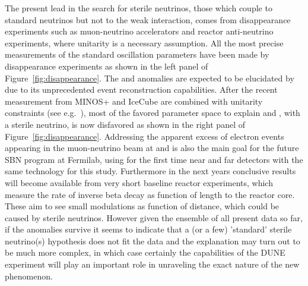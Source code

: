 The present lead in the search for sterile neutrinos, those which couple to standard neutrinos but not to the weak interaction, comes from disappearance experiments such as muon-neutrino accelerators and reactor anti-neutrino experiments, where unitarity is a necessary assumption. All the most precise measurements of the standard oscillation parameters have been made by disappearance experiments as shown in the left panel of Figure~\ref{fig:disappearance}. The  and \miniboone anomalies are expected to be elucidated by \microboone due to its unprecedented event reconstruction capabilities. After the recent measurement from MINOS+ and IceCube are combined with unitarity constraints (see e.g.~\cite{Parke:2015goa}), most of the favored parameter space to explain  and \miniboone, with a sterile neutrino, is now disfavored as shown in the right panel of Figure~\ref{fig:disappearance}. Addressing the apparent excess of electron events appearing in the muon-neutrino beam at \miniboone and  is also the main goal for the future SBN program at Fermilab, using for the first time near and far detectors with the same technology for this study. Furthermore  in the next years conclusive results will become available from very short baseline 
reactor experiments, which measure the rate of inverse beta decay 
as function of length to the reactor core. These aim to see
small modulations as function of distance, which could be caused
by sterile neutrinos. However given the ensemble of 
all present data so far, if the anomalies survive it seems to 
indicate that a (or a few) 'standard' sterile neutrino(s) 
hypothesis does not fit the data and the explanation may turn
out to be much more complex, in which case certainly the capabilities of the DUNE experiment will play an important role 
in unraveling the exact nature of the new phenomenon.


